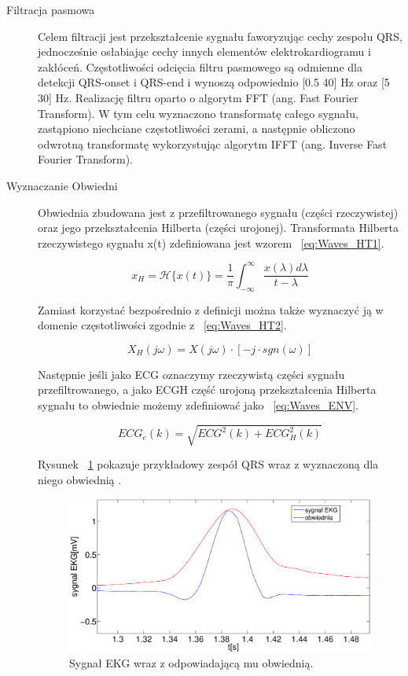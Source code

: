 \begin{description}
\item[Filtracja pasmowa]
Celem filtracji jest przekształcenie sygnału faworyzując cechy zespołu QRS, jednocześnie osłabiając cechy innych elementów elektrokardiogramu i zakłóceń. Częstotliwości odcięcia filtru pasmowego są odmienne dla detekcji QRS-onset i QRS-end i wynoszą odpowiednio [0.5 40] Hz oraz [5 30] Hz. Realizację filtru oparto o algorytm FFT (ang. Fast Fourier Transform). W tym celu  
wyznaczono transformatę całego sygnału, zastąpiono niechciane częstotliwości zerami, a następnie obliczono odwrotną transformatę wykorzystując algorytm IFFT (ang. Inverse Fast Fourier Transform).

\item[Wyznaczanie Obwiedni]
Obwiednia zbudowana jest z przefiltrowanego sygnału (części rzeczywistej) oraz jego przekształcenia Hilberta (części urojonej). Transformata Hilberta rzeczywistego sygnału x(t) zdefiniowana jest wzorem ~\ref{eq:Waves_HT1}.

\begin{equation} \label{eq:Waves_HT1}
x_H = \mathcal{H}\{x(t)\}=\frac{1}{\pi}\int_{-\infty}^\infty \frac{x(\lambda)d\lambda}{t-\lambda}
\end{equation}

Zamiast korzystać bezpośrednio z definicji można także wyznaczyć ją w domenie częstotliwości zgodnie z ~\ref{eq:Waves_HT2}.

\begin{equation} \label{eq:Waves_HT2}
X_H (j \omega) = X(j \omega) \cdot [-j \cdot sgn(\omega)]
\end{equation}

Następnie jeśli jako ECG oznaczymy rzeczywistą części sygnału przefiltrowanego, a jako ECGH część urojoną przekształcenia Hilberta sygnału to obwiednie możemy zdefiniować jako ~\ref{eq:Waves_ENV}.

\begin{equation} \label{eq:Waves_ENV}
ECG_{e} (k) = \sqrt{ECG^2 (k)+ ECG_{H}^2 (k) }
\end{equation}

Rysunek ~\ref{fig:Waves_ENV} pokazuje przykładowy zespół QRS wraz z wyznaczoną dla niego obwiednią . 

\begin{figure}[h]
\centering
\includegraphics[width=\textwidth,keepaspectratio] {Waves/img/Envelope.eps}
\caption{Sygnał EKG wraz z odpowiadającą mu obwiednią.}
\label{fig:Waves_ENV}
\end{figure}


\end{description}
